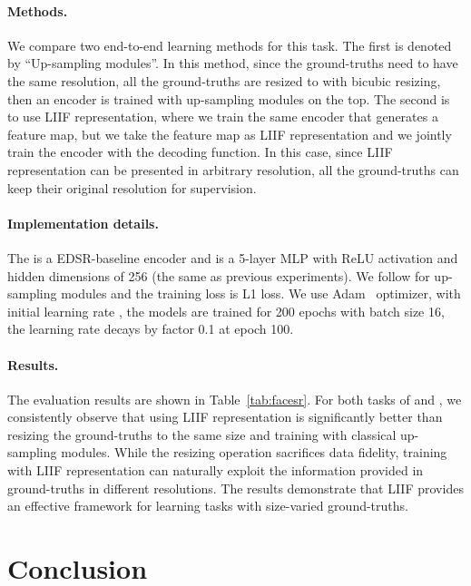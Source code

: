 \documentclass[final]{cvpr}
\begin{document}
\vspace{-1em}
\paragraph{Methods.} We compare two end-to-end learning methods for this task. The first is denoted by ``Up-sampling modules''. In this method, since the ground-truths need to have the same resolution, all the ground-truths are resized to  with bicubic resizing, then an encoder is trained with up-sampling modules on the top. The second is to use LIIF representation, where we train the same encoder that generates a feature map, but we take the feature map as LIIF representation and we jointly train the encoder with the decoding function. In this case, since LIIF representation can be presented in arbitrary resolution, all the ground-truths can keep their original resolution for supervision.

\vspace{-1em}
\paragraph{Implementation details.} The  is a EDSR-baseline encoder and  is a 5-layer MLP with ReLU activation and hidden dimensions of 256 (the same as previous experiments). We follow \cite{lim2017enhanced} for up-sampling modules and the training loss is L1 loss. We use Adam~\cite{kingma2014adam} optimizer, with initial learning rate , the models are trained for 200 epochs with batch size 16, the learning rate decays by factor 0.1 at epoch 100.

\vspace{-1em}
\paragraph{Results.} The evaluation results are shown in Table~\ref{tab:facesr}. For both tasks of  and , we consistently observe that using LIIF representation is significantly better than resizing the ground-truths to the same size and training with classical up-sampling modules. While the resizing operation sacrifices data fidelity, training with LIIF representation can naturally exploit the information provided in ground-truths in different resolutions. The results demonstrate that LIIF provides an effective framework for learning tasks with size-varied ground-truths.

\section{Conclusion}
\end{document}
